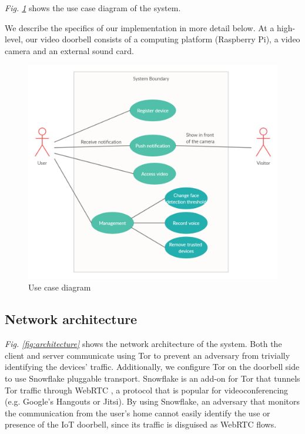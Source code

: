 \textit{Fig. \ref{fig:usecase}} shows the use case diagram of the system.

We describe the specifics of our implementation in more detail below. At a high-level, our video doorbell consists of a computing platform (Raspberry Pi), a video camera and an external sound card.

\begin{figure}
	\includegraphics[width=\linewidth]{Use_case_diagram.png}
	\caption{Use case diagram}
	\label{fig:usecase}
\end{figure}

\subsection{Network architecture}
\label{sec:netarch}
\textit{Fig. \ref{fig:architecture}} shows the network architecture of the system. Both the client and server communicate using Tor to prevent an adversary from trivially identifying the devices' traffic. Additionally, we configure Tor on the doorbell side to use Snowflake pluggable transport. Snowflake is an add-on for Tor that tunnels Tor traffic through WebRTC \cite{snowflake} \cite{macmillan2020evaluating}, a protocol that is popular for videoconferencing (e.g. Google's Hangouts or Jitsi). By using Snowflake, an adversary that monitors the communication from the user's home cannot easily identify the use or presence of the IoT doorbell, since its traffic is disguised as WebRTC flows.

